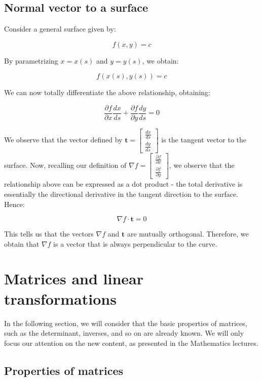 \documentclass[12pt]{article}
\begin{document}
\newpage

\subsection{Normal vector to a surface}

Consider a general surface given by:

\[ f(x, y) = c \]

By parametrizing $x = x(s)$ and $y = y(s)$, we obtain:

\[ f(x(s), y(s)) = c \]

We can now totally differentiate the above relationship, obtaining:

\[ \frac{\partial f}{\partial x}\frac{dx}{ds} + \frac{\partial f}{\partial y}\frac{dy}{ds} = 0 \]

We observe that the vector defined by $\mathbf{t} = \begin{bmatrix}
    \frac{dx}{ds} \\
    \frac{dy}{ds}
\end{bmatrix}$ is the tangent vector to the surface. Now, recalling our definition of $\nabla f = \begin{bmatrix}
    \frac{\partial f}{\partial x} \\
    \frac{\partial f}{\partial y}
\end{bmatrix}$, we observe that the relationship above can be expressed as a dot product - the total derivative is essentially the directional derivative in the tangent direction to the surface. Hence:

\[ \nabla f \cdot \mathbf{t} = 0 \]

This tells us that the vectors $\nabla f$ and $\mathbf{t}$ are mutually orthogonal. Therefore, we obtain that $\nabla f$ is a vector that is always perpendicular to the curve.

\newpage

\section{Matrices and linear transformations}

In the following section, we will consider that the basic properties of matrices, such as the determinant, inverses, and so on are already known. We will only focus our attention on the new content, as presented in the Mathematics lectures.

\subsection{Properties of matrices}
\end{document}
